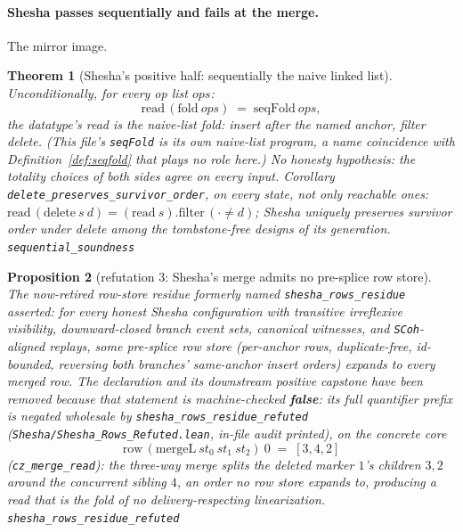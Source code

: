 \documentclass[11pt]{article}
\newtheorem{theorem}{Theorem}[section]
\newtheorem{proposition}[theorem]{Proposition}
\newcommand{\lean}[1]{\texttt{#1}}
\newcommand{\code}[1]{\texttt{#1}}
\begin{document}
\paragraph{Shesha passes sequentially and fails at the merge.}
The mirror image.

\begin{theorem}[Shesha's positive half: sequentially the naive
linked list]
\label{thm:sheshaseq}
Unconditionally, for every op list $\mathit{ops}$:
\[
  \mathrm{read}\,(\mathrm{fold}\ \mathit{ops})
  \;=\; \mathrm{seqFold}\ \mathit{ops} ,
\]
the datatype's read is the naive-list fold: insert after the named
anchor, filter delete. (This file's \lean{seqFold} is its own
naive-list program, a name coincidence with
Definition~\ref{def:seqfold} that plays no role here.) No honesty
hypothesis: the totality choices of both sides agree on every input.
Corollary \lean{delete\_preserves\_survivor\_order}, on \emph{every}
state, not only reachable ones:
$\mathrm{read}\,(\mathrm{delete}\ s\ d) =
(\mathrm{read}\ s).\mathrm{filter}\,(\cdot \ne d)$; Shesha uniquely
preserves survivor order under delete among the tombstone-free
designs of its generation.
\hfill\lean{sequential\_soundness}
\end{theorem}

\begin{proposition}[refutation 3: Shesha's merge admits no
pre-splice row store]
\label{prop:sheshamerge}
The now-retired row-store residue formerly named
\lean{shesha\_rows\_residue} asserted: for every honest Shesha
configuration with transitive irreflexive visibility, downward-closed
branch event sets, canonical witnesses, and \lean{SCoh}-aligned
replays, some pre-splice row store (per-anchor rows, duplicate-free,
id-bounded, reversing both branches' same-anchor insert orders)
expands to every merged row. The declaration and its downstream positive
capstone have been removed because that statement is machine-checked
\textbf{false}: its full quantifier prefix is negated wholesale by
\lean{shesha\_rows\_residue\_refuted}
(\code{Shesha/Shesha\_Rows\_Refuted.lean}, in-file audit printed), on
the concrete core
\[
  \mathrm{row}\,(\mathrm{mergeL}\ \mathit{st}_0\ \mathit{st}_1\
    \mathit{st}_2)\ 0 \;=\; [3, 4, 2]
\]
(\lean{cz\_merge\_read}): the three-way merge splits the deleted
marker $1$'s children $3, 2$ around the concurrent sibling $4$, an
order no row store expands to, producing a read that is the fold of
no delivery-respecting linearization.
\hfill\lean{shesha\_rows\_residue\_refuted}
\end{proposition}
\end{document}
